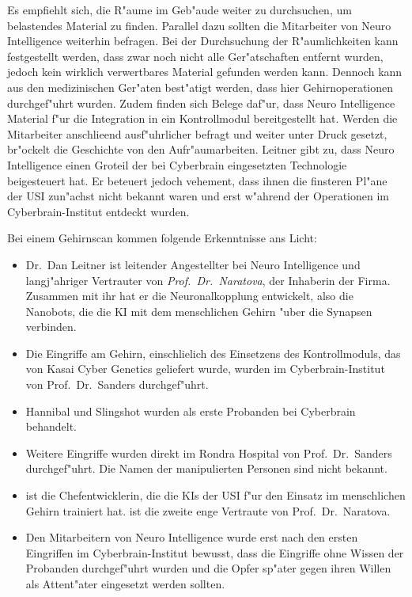 Es empfiehlt sich, die R"aume im Geb"aude weiter zu durchsuchen, um belastendes Material zu finden. Parallel dazu sollten die Mitarbeiter von Neuro Intelligence weiterhin befragen. Bei der Durchsuchung der R"aumlichkeiten kann festgestellt werden, dass zwar noch nicht alle Ger"atschaften entfernt wurden, jedoch kein wirklich verwertbares Material gefunden werden kann. Dennoch kann aus den medizinischen Ger"aten best"atigt werden, dass hier Gehirnoperationen durchgef"uhrt wurden. Zudem finden sich Belege daf"ur, dass Neuro Intelligence Material f"ur die Integration in ein Kontrollmodul bereitgestellt hat. Werden die Mitarbeiter anschlie\3end ausf"uhrlicher befragt und weiter unter Druck gesetzt, br"ockelt die Geschichte von den Aufr"aumarbeiten. Leitner gibt zu, dass Neuro Intelligence einen Gro\3teil der bei Cyberbrain eingesetzten Technologie beigesteuert hat. Er beteuert jedoch vehement, dass ihnen die finsteren Pl"ane der USI zun"achst nicht bekannt waren und erst w"ahrend der Operationen im Cyberbrain-Institut entdeckt wurden.

Bei einem Gehirnscan kommen folgende Erkenntnisse ans Licht:

\begin{itemize}
	\item Dr.~Dan Leitner ist leitender Angestellter bei Neuro Intelligence und langj"ahriger Vertrauter von \emph{Prof.~Dr.~Naratova}, der 
		Inhaberin der Firma. Zusammen mit ihr hat er die Neuronalkopplung entwickelt, also die Nanobots, die die KI mit dem menschlichen Gehirn "uber die Synapsen verbinden.
	\item Die Eingriffe am Gehirn, einschlie\3lich des Einsetzens des Kontrollmoduls, das von Kasai Cyber Genetics geliefert wurde, wurden 
		im Cyberbrain-Institut von Prof.~Dr.~Sanders durchgef"uhrt.
	\item Hannibal und Slingshot wurden als erste Probanden bei Cyberbrain behandelt.
	\item Weitere Eingriffe wurden direkt im Rondra Hospital von Prof.~Dr.~Sanders durchgef"uhrt. Die Namen der manipulierten Personen sind 
		nicht bekannt.
	\item \ml{} ist die Chefentwicklerin, die die KIs der USI f"ur den Einsatz im menschlichen Gehirn trainiert hat. \ml{} ist die zweite 
		enge Vertraute  von Prof.~Dr.~Naratova.
	\item Den Mitarbeitern von Neuro Intelligence wurde erst nach den ersten Eingriffen im Cyberbrain-Institut bewusst, dass die Eingriffe 
		ohne Wissen der Probanden durchgef"uhrt wurden und die Opfer sp"ater gegen ihren Willen als Attent"ater eingesetzt werden sollten.
\end{itemize}

